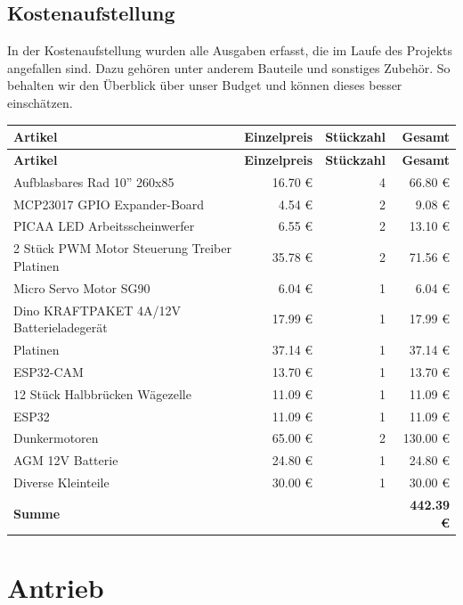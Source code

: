 \documentclass[ngerman,12pt,a4paper]{article}
\begin{document}
		\subsection{Kostenaufstellung} %
		In der Kostenaufstellung wurden alle Ausgaben erfasst, die im Laufe des Projekts angefallen sind. Dazu gehören unter anderem Bauteile und sonstiges Zubehör. So behalten wir den Überblick über unser Budget und können dieses besser einschätzen.
			\begin{center}
				\begin{longtable}{| p{8.2cm} | r | r | r |}
					\hline
					\textbf{Artikel} & \textbf{Einzelpreis} & \textbf{Stückzahl} & \textbf{Gesamt} \\
					\hline
					\endfirsthead
					\hline
					\textbf{Artikel} & \textbf{Einzelpreis} & \textbf{Stückzahl} & \textbf{Gesamt} \\
					\hline
					\endhead
					\hline
					Aufblasbares Rad 10'' 260x85  & 16.70 € & 4 & 66.80 € \\ \hline
					MCP23017 GPIO Expander-Board & 4.54 € & 2 & 9.08 € \\ \hline
					PICAA LED Arbeitsscheinwerfer & 6.55 € & 2 & 13.10 € \\ \hline
					2 Stück PWM Motor Steuerung Treiber Platinen & 35.78 € & 2 & 71.56 € \\ \hline
					Micro Servo Motor SG90 & 6.04 € & 1 & 6.04 € \\ \hline
					Dino KRAFTPAKET 4A/12V Batterieladegerät & 17.99 € & 1 & 17.99 € \\ \hline
					Platinen & 37.14 € & 1 & 37.14 € \\ \hline
					ESP32-CAM & 13.70 € & 1 & 13.70 € \\ \hline
					12 Stück Halbbrücken Wägezelle & 11.09 € & 1 & 11.09 € \\ \hline
					ESP32 & 11.09 € & 1 & 11.09 € \\ \hline
					Dunkermotoren & 65.00 € & 2 & 130.00 € \\ \hline
					AGM 12V Batterie & 24.80 € & 1 & 24.80 € \\ \hline
					Diverse Kleinteile & 30.00 € & 1 & 30.00 € \\ \hline
					\textbf{Summe} & & & \textbf{442.39 €} \\
					\hline
				\end{longtable}
			\end{center}
			\newpage
	\section{Antrieb}
\end{document}
